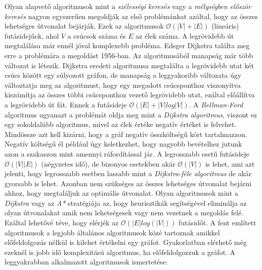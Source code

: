 \noindent Olyan alapvető algoritmusok mint a \textit{szélességi
keresés} vagy a \textit{mélységben először keresés} nagyon egyszerűen megoldják az első problémánkat azáltal, hogy az összes lehetséges útvonalat bejárják. Ezek az algoritmusok $\mathcal{O}(|V| + |E|)$ (lineáris) futásidejűek, ahol $V$ a csúcsok száma és $E$ az élek száma.
\newline
\newline A legrövidebb út megtalálása már ennél jóval komplexebb probléma. 
\newline
\newline Edsger Dijkstra találta meg erre a problémára a megoldást 1956-ban. Az algoritmusából manapság már több változat is létezik. Dijkstra eredeti algoritmusa megtalálta a legrövidebb utat két csúcs között egy súlyozott gráfon, de manapság a leggyakoribb változata úgy változtatja meg az algoritmust, hogy egy megadott csúcsponthoz viszonyítva kiszámítja az összes többi csúcsponthoz vezető legrövidebb utat, ezáltal előállítva a legrövidebb út fát. Ennek a futásideje $\mathcal{O}(|E| + |V| log|V|)$. 
\newline
\newline A \textit{Bellman-Ford} algoritmus ugyanazt a problémát oldja meg mint a \textit{Dijkstra algoritmus}, viszont ez egy sokoldalúbb algoritmus, mivel az élek értéke negatív értéket is felvehet. Mindössze azt kell kizárni, hogy a gráf negatív összköltségű kört tartalmazzon. Negatív költségű él például úgy keletkezhet, hogy nagyobb bevételhez jutunk azon a szakaszon mint amennyi ráfordítással jár. A legrosszabb esetű futásideje $\mathcal{O}(|V||E|)$ (négyzetes idő), de bizonyos esetekben akár $\mathcal{O}(|V|)$ is lehet, ami azt jelenti, hogy legrosszabb esetben lassabb mint a \textit{Dijkstra-féle algoritmus} de akár gyorsabb is lehet. 
\newline
\newline Azonban nem szükséges az összes lehetséges útvonalat bejárni ahhoz, hogy megtaláljuk az optimális útvonalat. Olyan algoritmusok mint a \textit{Dijkstra} vagy az \textit{A*} stratégiája az, hogy heurisztikák segítségével eliminálja az olyan útvonalakat amik nem lehetségesek vagy nem vezetnek a megoldás felé. Ezáltal lehetővé téve, hogy elérjék az $\mathcal{O}(|E| log(|V|))$ futásidőt. 
\newline
\newline A fent említett algoritmusok a legjobb általános algoritmusok közé tartoznak amikkel előfeldolgozás nélkül is kilehet értékelni egy gráfot. Gyakorlatban elérhető még ezeknél is jobb idő komplexitású algoritmus, ha előfeldolgozzuk a gráfot.
\newline
\newline A leggyakrabban alkalmazott algoritmusok ismertetése:

